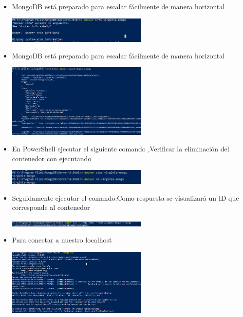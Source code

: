 \documentclass[%
 reprint,
 amsmath,amssymb,
 aps,
]{revtex4-1}
\begin{document}
\begin{itemize}
\begin{center}
		\end{center}	
                    \item MongoDB está preparado para escalar fácilmente de manera horizontal
                     \begin{center}
		\includegraphics[width=7cm]{./Imagenes/21}
		\end{center}
                     \item MongoDB está preparado para escalar fácilmente de manera horizontal
                     \begin{center}
		\includegraphics[width=7cm]{./Imagenes/22}
		\end{center}
                     \item En PowerShell ejecutar el siguiente comando ,Verificar la eliminación del contenedor con ejecutando
                     \begin{center}
		\includegraphics[width=7cm]{./Imagenes/23}
		\end{center}	
                      \item  Seguidamente ejecutar el comando:Como respuesta se visualizará un ID que corresponde al contenedor
                     \begin{center}
		\includegraphics[width=7cm]{./Imagenes/24}
		\end{center}	
                     \item Para conectar  a nuestro localhost 
                     \begin{center}
		\includegraphics[width=7cm]{./Imagenes/25}
		\end{center}		
	          \end{itemize}
\end{document}
